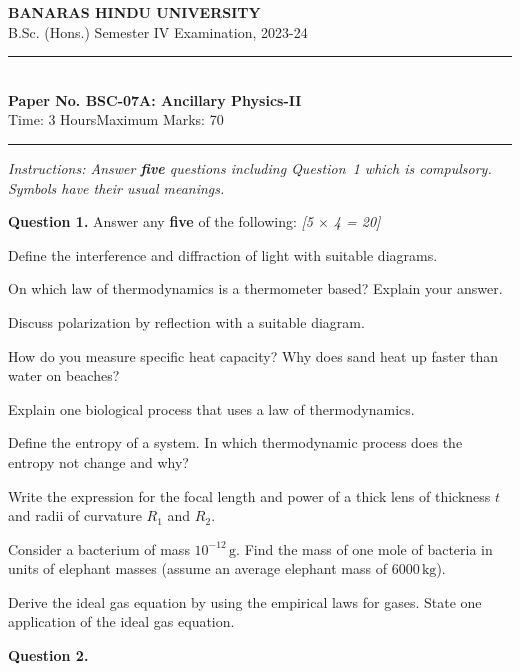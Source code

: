 \documentclass[11pt,a4paper]{article}
\newcommand{\pts}[1]{\hfill   \textit{[#1]}}
\begin{document}
\begin{center}
  {\large\bfseries BANARAS HINDU UNIVERSITY}\\[2pt]
  {\normalsize B.Sc. (Hons.) Semester IV Examination, 2023-24}\\[6pt]
  \rule{0.8\linewidth}{0.5pt}\\[6pt]
  {\large\bfseries Paper No. BSC-07A: Ancillary Physics-II}\\[4pt]
  {\normalsize Time: 3 Hours\hfill Maximum Marks: 70}
\end{center}
\rule{\linewidth}{0.4pt}
\smallskip



\noindent   \textit{Instructions: Answer   \textbf{five} questions including Question~1 which is compulsory. Symbols have their usual meanings.}
\bigskip




\noindent   \textbf{Question 1.} Answer any   \textbf{five} of the following: \pts{5 $ \times$ 4 = 20}

\begin{parts}
  \item Define the interference and diffraction of light with suitable diagrams.
  \item On which law of thermodynamics is a thermometer based? Explain your answer.
  \item Discuss polarization by reflection with a suitable diagram.
  \item How do you measure specific heat capacity? Why does sand heat up faster than water on beaches?
  \item Explain one biological process that uses a law of thermodynamics.
  \item Define the entropy of a system. In which thermodynamic process does the entropy not change and why?
  \item Write the expression for the focal length and power of a thick lens of thickness $t$ and radii of curvature $R_1$ and $R_2$.
  \item Consider a bacterium of mass $10^{-12}\, \text{g}$. Find the mass of one mole of bacteria in units of elephant masses (assume an average elephant mass of $6000\, \text{kg}$).
  \item Derive the ideal gas equation by using the empirical laws for gases. State one application of the ideal gas equation.
\end{parts}

\medskip


\noindent   \textbf{Question 2.} 
\end{document}
